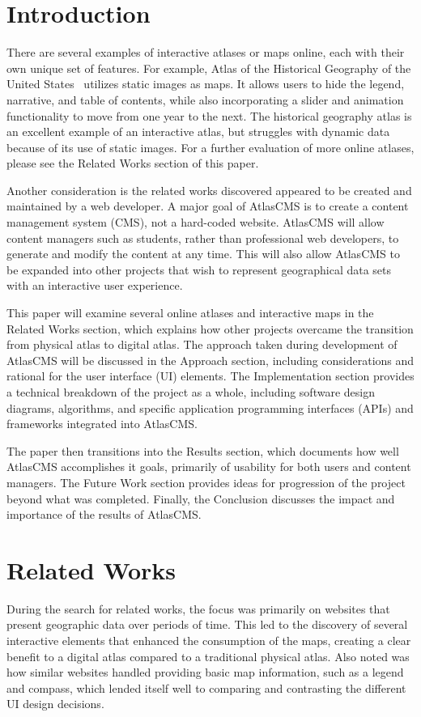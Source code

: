 \documentclass[11pt, final, conference, twocolumn]{IEEEtran}
\begin{document}
\IEEEpeerreviewmaketitle

\section{Introduction}

There are several examples of interactive atlases or maps online, each with their own unique set of features. For example, Atlas of the Historical Geography of the United States~\cite{us-historical-atlas-2014} utilizes static images as maps.  It allows users to hide the legend, narrative, and table of contents, while also incorporating a slider and animation functionality to move from one year to the next.  The historical geography atlas is an excellent example of an interactive atlas, but struggles with dynamic data because of its use of static images. For a further evaluation of more online atlases, please see the Related Works section of this paper.

Another consideration is the related works discovered appeared to be created and maintained by a web developer. A major goal of AtlasCMS is to create a content management system (CMS), not a hard-coded website. AtlasCMS will allow content managers such as students, rather than professional web developers, to generate and modify the content at any time. This will also allow AtlasCMS to be expanded into other projects that wish to represent geographical data sets with an interactive user experience.

This paper will examine several online atlases and interactive maps in the Related Works section, which explains how other projects overcame the transition from physical atlas to digital atlas. The approach taken during development of AtlasCMS will be discussed in the Approach section, including considerations and rational for the user interface (UI) elements. The Implementation section provides a technical breakdown of the project as a whole, including software design diagrams, algorithms, and specific application programming interfaces (APIs) and frameworks integrated into AtlasCMS.

The paper then transitions into the Results section, which documents how well AtlasCMS accomplishes it goals, primarily of usability for both users and content managers. The Future Work section provides ideas for progression of the project beyond what was completed. Finally, the Conclusion discusses the impact and importance of the results of AtlasCMS.

\section{Related Works}
During the search for related works, the focus was primarily on websites that present geographic data over periods of time. This led to the discovery of several interactive elements that enhanced the consumption of the maps, creating a clear benefit to a digital atlas compared to a traditional physical atlas. Also noted was how similar websites handled providing basic map information, such as a legend and compass, which lended itself well to comparing and contrasting the different UI design decisions.
\end{document}
